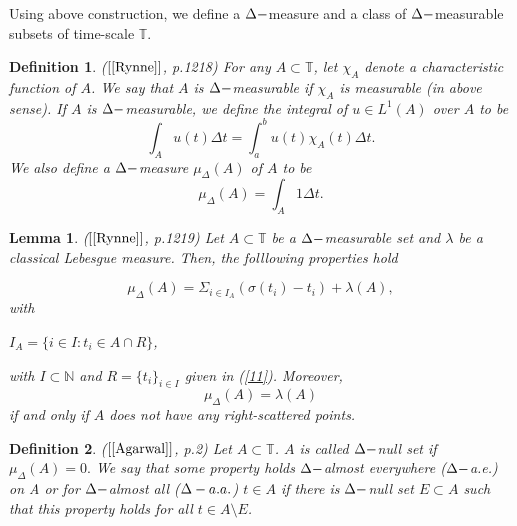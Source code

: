 \documentclass[12pt,a4paper,oneside,titlepage]{article}
\newtheorem{Def}{Definition}
\newtheorem{Lemat}{Lemma}
\begin{document}
Using above construction, we define a $\Delta \-- $measure and a class of $\Delta \-- $measurable subsets of time-scale $\mathbb{T}$. 



\begin{Def} ($[\ref{Rynne}]$, p.1218)
For any $A \subset \mathbb{T}$, let $\chi_{A}$ denote a characteristic function of $A$. We say that $A$ is $\Delta \-- $measurable if $\chi_{A}$ is measurable (in above sense). If $A$ is $\Delta \-- $measurable, we define the integral of $u \in L^{1}(A)$ over $A$ to be 
\begin{equation}
\nonumber
\int_{A} u(t) \Delta t = \int_{a}^{b} u (t) \chi_{A}(t) \Delta t.
\end{equation}
We also define a $\Delta \-- $measure $\mu_{\Delta}(A)$ of $A$ to be
\begin{equation}
\nonumber
\mu_{\Delta}(A)= \int_{A} 1 \Delta t.
\end{equation}
\end{Def}

\bigskip
\indent



\begin{Lemat} ($[\ref{Rynne}]$, p.1219)
Let $A \subset \mathbb{T}$ be a $\Delta \-- $measurable  set and $\lambda$ be a classical Lebesgue measure. Then, the folllowing properties hold

\begin{equation}
\label{miara_lebesgue+delta}
\mu_{\Delta}(A) = \Sigma_{i \in I_A} \left( \sigma(t_i) - t_i \right) + \lambda(A),
\end{equation}
with
\begin{center}
$I_A= \lbrace i \in I: t_i \in A \cap R \rbrace$,
\end{center}
with $I \subset \mathbb{N}$ and $R = \lbrace t_i \rbrace_{i \in I}$ given in (\ref{11}).
Moreover,
\begin{equation}
\mu_{\Delta}(A) = \lambda(A)
\end{equation}
 if and only if  $A$ does not have any right-scattered points.
\end{Lemat}

\begin{Def} ($[\ref{Agarwal}]$, p.2) Let $A \subset \mathbb{T}$. $A$ is called $\Delta \-- $null set if $\mu_{\Delta}(A)=0.$ We say that some property holds $\Delta \-- $almost everywhere ($\Delta \-- $a.e.) on A or for $\Delta \-- $almost all ($\Delta \-- a.a.$) $t \in A$ if there is $\Delta \-- $null set $E \subset A$ such that this property holds for all $t \in A \setminus E$.
\end{Def}
\end{document}
